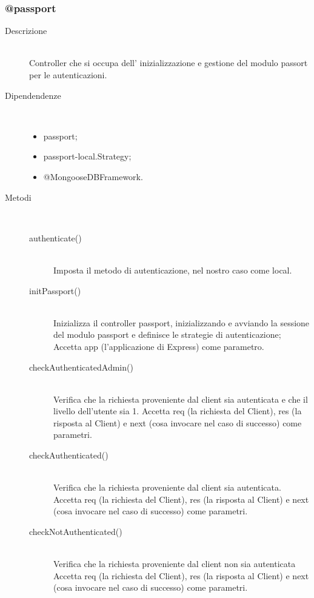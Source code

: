 \subsubsection{@passport}
\begin{description}
 \item[Descrizione] \hfill \\
Controller che si occupa dell' inizializzazione e gestione del modulo passort per le autenticazioni.
\item[Dipendendenze] \hfill \\
  \begin{itemize}
   \item passport;
   \item passport-local.Strategy;
   \item @MongooseDBFramework.
  \end{itemize}
   \item[Metodi] \hfill \\
    \begin{description}
     \item[authenticate()] \hfill \\
     Imposta il metodo di autenticazione, nel nostro caso come local.
     \item[initPassport()] \hfill \\
     Inizializza il controller passport, inizializzando e avviando la sessione del modulo passport e definisce le strategie di autenticazione; Accetta app (l'applicazione di Express) come parametro.
     \item[checkAuthenticatedAdmin()] \hfill \\
     Verifica che la richiesta proveniente dal client sia autenticata e che il livello dell'utente sia 1. Accetta req (la richiesta del Client), res (la risposta al Client) e next (cosa invocare nel caso di successo) come parametri.
     \item[checkAuthenticated()] \hfill \\
     Verifica che la richiesta proveniente dal client sia autenticata. Accetta req (la richiesta del Client), res (la risposta al Client) e next (cosa invocare nel caso di successo) come parametri.
     \item[checkNotAuthenticated()] \hfill \\
     Verifica che la richiesta proveniente dal client non sia autenticata Accetta req (la richiesta del Client), res (la risposta al Client) e next (cosa invocare nel caso di successo) come parametri.
     \end{description}
\end{description}

